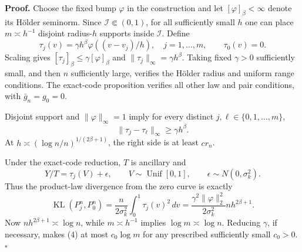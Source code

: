 \textbf{Proof.}
Choose the fixed bump \(\varphi\) in the construction and let \([\varphi]_\beta<\infty\) denote its H\"older seminorm. Since \(\mathcal I\Subset(0,1)\), for all sufficiently small \(h\) one can place \(m\asymp h^{-1}\) disjoint radius-\(h\) supports inside \(\mathcal I\). Define
\[
 \tau_j(v)=\gamma h^\beta\varphi((v-v_j)/h),
 \quad j=1,\ldots,m,\qquad \tau_0(v)=0. \tag{1}
\]
Scaling gives \([\tau_j]_\beta\le\gamma[\varphi]_\beta\) and \(\|\tau_j\|_\infty=\gamma h^\beta\). Taking fixed \(\gamma>0\) sufficiently small, and then \(n\) sufficiently large, verifies the H\"older radius and uniform range conditions. The exact-code proposition verifies all other law and pair conditions, with \(\bar g_n=g_0=0\).

Disjoint support and \(\|\varphi\|_\infty=1\) imply for every distinct \(j,\ell\in\{0,1,\ldots,m\}\),
\[
 \|\tau_j-\tau_\ell\|_\infty\ge\gamma h^\beta. \tag{2}
\]
At \(h\asymp(\log n/n)^{1/(2\beta+1)}\), the right side is at least \(cr_n\).

Under the exact-code reduction, \(T\) is ancillary and
\[
 Y/T=\tau_j(V)+\epsilon,\qquad
 V\sim\operatorname{Unif}[0,1],\qquad
 \epsilon\sim N(0,\sigma_k^2). \tag{3}
\]
Thus the product-law divergence from the zero curve is exactly
\[
 \operatorname{KL}(P_j^n,P_0^n)
 =\frac{n}{2\sigma_k^2}\int_0^1\tau_j(v)^2\,dv
 =\frac{\gamma^2\|\varphi\|_2^2}{2\sigma_k^2}
 nh^{2\beta+1}. \tag{4}
\]
Now \(nh^{2\beta+1}\asymp\log n\), while \(m\asymp h^{-1}\) implies \(\log m\asymp\log n\). Reducing \(\gamma\), if necessary, makes (4) at most \(c_0\log m\) for any prescribed sufficiently small \(c_0>0\). \(\square\)